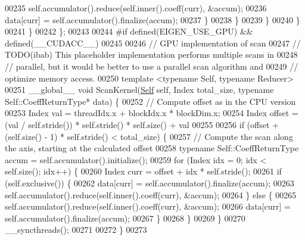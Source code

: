 \begin{DoxyCode}
00235             \textcolor{keyword}{self}.accumulator().reduce(\textcolor{keyword}{self}.inner().coeff(curr), &accum);
00236             data[curr] = \textcolor{keyword}{self}.accumulator().finalize(accum);
00237           \}
00238         \}
00239       \}
00240     \}
00241   \}
00242 \};
00243 
00244 \textcolor{preprocessor}{#if defined(EIGEN\_USE\_GPU) && defined(\_\_CUDACC\_\_)}
00245 
00246 \textcolor{comment}{// GPU implementation of scan}
00247 \textcolor{comment}{// TODO(ibab) This placeholder implementation performs multiple scans in}
00248 \textcolor{comment}{// parallel, but it would be better to use a parallel scan algorithm and}
00249 \textcolor{comment}{// optimize memory access.}
00250 \textcolor{keyword}{template} <\textcolor{keyword}{typename} Self, \textcolor{keyword}{typename} Reducer>
00251 \_\_global\_\_ \textcolor{keywordtype}{void} ScanKernel(\hyperlink{struct_eigen_1_1_tensor_evaluator_3_01const_01_tensor_scan_op_3_01_op_00_01_arg_type_01_4_00_01_device_01_4}{Self} \textcolor{keyword}{self}, Index total\_size, \textcolor{keyword}{typename} Self::CoeffReturnType* data) \{
00252   \textcolor{comment}{// Compute offset as in the CPU version}
00253   Index val = threadIdx.x + blockIdx.x * blockDim.x;
00254   Index offset = (val / \textcolor{keyword}{self}.stride()) * \textcolor{keyword}{self}.stride() * \textcolor{keyword}{self}.size() + val %
00255 
00256   \textcolor{keywordflow}{if} (offset + (\textcolor{keyword}{self}.size() - 1) * \textcolor{keyword}{self}.stride() < total\_size) \{
00257     \textcolor{comment}{// Compute the scan along the axis, starting at the calculated offset}
00258     \textcolor{keyword}{typename} Self::CoeffReturnType accum = \textcolor{keyword}{self}.accumulator().initialize();
00259     \textcolor{keywordflow}{for} (Index idx = 0; idx < \textcolor{keyword}{self}.size(); idx++) \{
00260       Index curr = offset + idx * \textcolor{keyword}{self}.stride();
00261       \textcolor{keywordflow}{if} (\textcolor{keyword}{self}.exclusive()) \{
00262         data[curr] = \textcolor{keyword}{self}.accumulator().finalize(accum);
00263         \textcolor{keyword}{self}.accumulator().reduce(\textcolor{keyword}{self}.inner().coeff(curr), &accum);
00264       \} \textcolor{keywordflow}{else} \{
00265         \textcolor{keyword}{self}.accumulator().reduce(\textcolor{keyword}{self}.inner().coeff(curr), &accum);
00266         data[curr] = \textcolor{keyword}{self}.accumulator().finalize(accum);
00267       \}
00268     \}
00269   \}
00270   \_\_syncthreads();
00271 
00272 \}
00273 

\end{DoxyCode}
